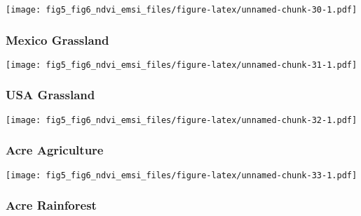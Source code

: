 \documentclass[
]{article}
\begin{document}
\texttt{[image: fig5\_fig6\_ndvi\_emsi\_files/figure-latex/unnamed-chunk-30-1.pdf]}

\hypertarget{htmlwidget-c1b8f194c92d455798e2}{}
\begin{plotly}

\end{plotly}

\hypertarget{mexico-grassland}{%
\subsubsection{Mexico Grassland}\label{mexico-grassland}}

\texttt{[image: fig5\_fig6\_ndvi\_emsi\_files/figure-latex/unnamed-chunk-31-1.pdf]}

\hypertarget{htmlwidget-ca079151cbf6cf9334da}{}
\begin{plotly}

\end{plotly}

\hypertarget{usa-grassland}{%
\subsubsection{USA Grassland}\label{usa-grassland}}

\texttt{[image: fig5\_fig6\_ndvi\_emsi\_files/figure-latex/unnamed-chunk-32-1.pdf]}

\hypertarget{htmlwidget-450511c6d3ef593b1f8d}{}
\begin{plotly}

\end{plotly}

\hypertarget{acre-agriculture-1}{%
\subsubsection{Acre Agriculture}\label{acre-agriculture-1}}

\texttt{[image: fig5\_fig6\_ndvi\_emsi\_files/figure-latex/unnamed-chunk-33-1.pdf]}

\hypertarget{htmlwidget-16791988ecb1a6cd2575}{}
\begin{plotly}

\end{plotly}

\hypertarget{acre-rainforest-1}{%
\subsubsection{Acre Rainforest}\label{acre-rainforest-1}}
\end{document}
